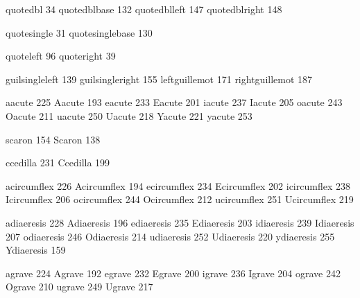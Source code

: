  quotedbl           34
 quotedblbase      132
 quotedblleft      147
 quotedblright     148

 quotesingle        31
 quotesinglebase   130

 quoteleft          96 
 quoteright         39 

 guilsingleleft    139
 guilsingleright   155
 leftguillemot     171
 rightguillemot    187

 aacute            225
 Aacute            193
 eacute            233
 Eacute            201
 iacute            237
 Iacute            205
 oacute            243
 Oacute            211
 uacute            250
 Uacute            218
 Yacute            221
 yacute            253

 scaron            154
 Scaron            138

 ccedilla          231
 Ccedilla          199

 acircumflex       226
 Acircumflex       194
 ecircumflex       234
 Ecircumflex       202
 icircumflex       238
 Icircumflex       206
 ocircumflex       244
 Ocircumflex       212
 ucircumflex       251
 Ucircumflex       219

 adiaeresis        228
 Adiaeresis        196
 ediaeresis        235
 Ediaeresis        203
 idiaeresis        239
 Idiaeresis        207
 odiaeresis        246
 Odiaeresis        214
 udiaeresis        252
 Udiaeresis        220
 ydiaeresis        255
 Ydiaeresis        159

 agrave            224
 Agrave            192
 egrave            232
 Egrave            200
 igrave            236
 Igrave            204
 ograve            242
 Ograve            210
 ugrave            249
 Ugrave            217

